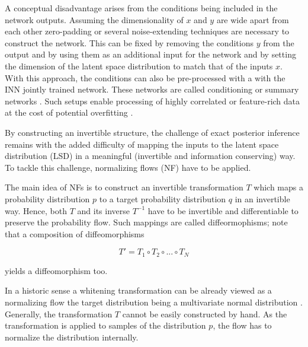 
A conceptual disadvantage arises from the conditions being included in the network outputs. Assuming the dimensionality of $x$ and $y$ are wide apart from each other zero-padding or several noise-extending techniques are necessary to construct the network. This can be fixed by removing the conditions $y$ from the output and by using them as an additional input for the network and by setting the dimension of the latent space distribution to match that of the inputs $x$. With this approach, the conditions can also be pre-processed with a with the INN jointly trained network. These networks are called conditioning or summary networks \cite{BayesFlow}. Such setups enable processing of highly correlated or feature-rich data at the cost of potential overfitting \cite{Ksoll_2020}. 


By constructing an invertible structure, the challenge of exact posterior inference remains with the added difficulty of mapping the inputs to the latent space distribution (LSD) in a meaningful (invertible and information conserving) way. To tackle this challenge, normalizing flows (NF) have to be applied.


The main idea of NFs is to construct an invertible transformation $T$ which maps a probability distribution $p$ to a target probability distribution $q$ in an invertible way. Hence, both $T$ and its inverse $T^{-1}$ have to be invertible and differentiable to preserve the probability flow. Such mappings are called diffeormophisms; note that a composition of diffeomorphisms

\begin{equation*}
	T' = T_1 \circ T_2 \circ ... \circ T_N
\end{equation*}

yields a diffeomorphism too.

In a historic sense a whitening transformation can be already viewed as a normalizing flow the target distribution being a multivariate normal distribution \cite{Papamakarios_NF}. Generally, the transformation $T$ cannot be easily constructed by hand. As the transformation is applied to samples of the distribution $p$, the flow has to normalize the distribution internally.


